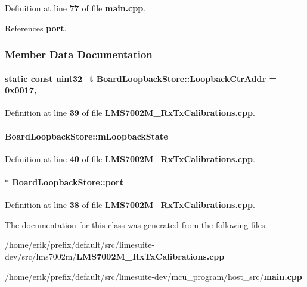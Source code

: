 Definition at line {\bf 77} of file {\bf main.\+cpp}.



References {\bf port}.



\subsubsection{Member Data Documentation}
\paragraph[{Loopback\+Ctr\+Addr}]{\setlength{\rightskip}{0pt plus 5cm}static const uint32\+\_\+t Board\+Loopback\+Store\+::\+Loopback\+Ctr\+Addr = 0x0017\hspace{0.3cm}{\ttfamily [static]}, {\ttfamily [private]}}\label{classBoardLoopbackStore_a68dc4d542d2f9db1dcc19f6b032a6b5f}


Definition at line {\bf 39} of file {\bf L\+M\+S7002\+M\+\_\+\+Rx\+Tx\+Calibrations.\+cpp}.

\paragraph[{m\+Loopback\+State}]{ Board\+Loopback\+Store\+::m\+Loopback\+State\hspace{0.3cm}{\ttfamily [private]}}\label{classBoardLoopbackStore_aa254ae7982de2601ed221f767e4243d8}


Definition at line {\bf 40} of file {\bf L\+M\+S7002\+M\+\_\+\+Rx\+Tx\+Calibrations.\+cpp}.

\paragraph[{port}]{ $\ast$ Board\+Loopback\+Store\+::port\hspace{0.3cm}{\ttfamily [private]}}\label{classBoardLoopbackStore_aefdba4ae83ac993d5b878454f007f236}


Definition at line {\bf 38} of file {\bf L\+M\+S7002\+M\+\_\+\+Rx\+Tx\+Calibrations.\+cpp}.



The documentation for this class was generated from the following files\+:\begin{DoxyCompactItemize}
\item 
/home/erik/prefix/default/src/limesuite-\/dev/src/lms7002m/{\bf L\+M\+S7002\+M\+\_\+\+Rx\+Tx\+Calibrations.\+cpp}\item 
/home/erik/prefix/default/src/limesuite-\/dev/mcu\+\_\+program/host\+\_\+src/{\bf main.\+cpp}\end{DoxyCompactItemize}
